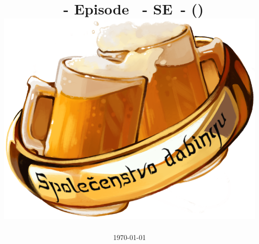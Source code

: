 \documentclass[twoside, a4paper, 10pt]{article}
\begin{document}


\def\mytitle{%
    \myanime\ - 
    \ifx\myserie\empty
    \ifx\myepisode\empty
    \else
    Episode \myepisode\ - 
    \fi
    \else
    \ifx\myepisode\empty
    \else
    S\myserie E\myepisode\ - 
    \fi
    \fi
    \myepisodename
    \ifx\mytimes\empty
    \else
        \space(\mytimes)
    \fi
    \vspace{10px}
}
\title{\Large{\mytitle}\\ \includegraphics[scale=0.5]{imgs/logo.png}}
\author{\myauthor}
\date{\today}

\maketitle
\thispagestyle{empty}


\newpage

\setcounter{page}{1}

\begin{tabularx}{\textwidth}{rcX}
    
    
    
\end{tabularx}
    
\end{document}
